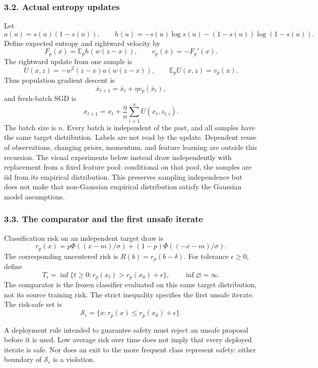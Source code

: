 \subsubsection{3.2. Actual entropy
updates}\label{draft-actual-entropy-updates}

Let \[
a(u)=s(u)(1-s(u)),\qquad
h(u)=-s(u)\log s(u)-(1-s(u))\log(1-s(u)).
\] Define expected entropy and rightward velocity by \[
F_p(x)=\mathbb E_p h(w(z-x)),\qquad v_p(x)=-F_p'(x).
\] The rightward update from one sample is \[
U(x,z)=-w^2(z-x)a(w(z-x)),\qquad \mathbb E_pU(x,z)=v_p(x).
\] Thus population gradient descent is \[
\bar x_{t+1}=\bar x_t+\eta v_p(\bar x_t),
\] and fresh-batch SGD is \[
x_{t+1}=x_t+\frac{\eta}{n}\sum_{i=1}^n U(x_t,z_{t,i}).
\] The batch size is \(n\). Every batch is independent of the past, and
all samples have the same target distribution. Labels are not read by
the update. Dependent reuse of observations, changing priors, momentum,
and feature learning are outside this recursion. The visual experiments
below instead draw independently with replacement from a fixed feature
pool: conditional on that pool, the samples are iid from its empirical
distribution. This preserves sampling independence but does not make
that non-Gaussian empirical distribution satisfy the Gaussian model
assumptions.

\subsubsection{3.3. The comparator and the first unsafe
iterate}\label{draft-the-comparator-and-the-first-unsafe-iterate}

Classification risk on an independent target draw is \[
r_p(x)=p\Phi((x-m)/\sigma)+(1-p)\Phi((-x-m)/\sigma).
\] The corresponding uncentered risk is \(R(b)=r_p(b-\delta)\). For
tolerance \(\epsilon\ge0\), define \[
T_\epsilon=\inf\{t\ge0:r_p(x_t)>r_p(x_0)+\epsilon\},
\qquad \inf\varnothing=\infty.
\] The comparator is the frozen classifier evaluated on this same target
distribution, not its source training risk. The strict inequality
specifies the first unsafe iterate. The risk-safe set is \[
\mathcal S_\epsilon=\{x:r_p(x)\le r_p(x_0)+\epsilon\}.
\]

A deployment rule intended to guarantee safety must reject an unsafe
proposal before it is used. Low average risk over time does not imply
that every deployed iterate is safe. Nor does an exit to the more
frequent class represent safety: either boundary of
\(\mathcal S_\epsilon\) is a violation.

